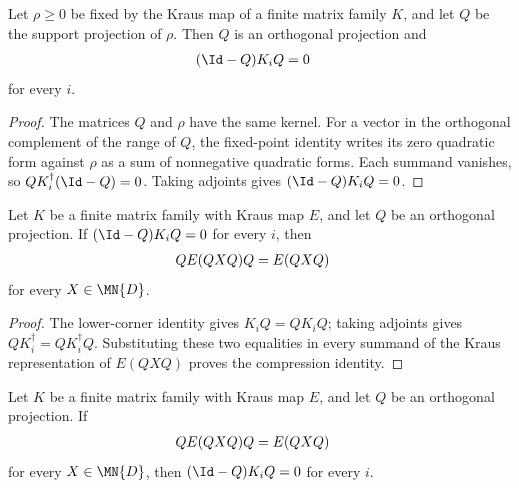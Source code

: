 \begin{theorem}
    \label{thm:kraus_fixed_support_lower_zero}
    \leanok
    Let $\rho\geq0$ be fixed by the Kraus map of a finite matrix family $K$, and
    let $Q$ be the support projection of $\rho$. Then $Q$ is an orthogonal
    projection and
    \begin{align}
        (\Id-Q)K_iQ
         & =0
        \notag
    \end{align}
    for every $i$.
\end{theorem}

\begin{proof}
    \leanok
    The matrices $Q$ and $\rho$ have the same kernel. For a vector in the
    orthogonal complement of the range of $Q$, the fixed-point identity writes
    its zero quadratic form against $\rho$ as a sum of nonnegative quadratic
    forms. Each summand vanishes, so $QK_i^\dagger(\Id-Q)=0$. Taking adjoints
    gives $(\Id-Q)K_iQ=0$.
\end{proof}

\begin{theorem}
    \label{thm:kraus_lower_zero_invariant_compression}
    \leanok
    Let $K$ be a finite matrix family with Kraus map $E$, and let $Q$ be an
    orthogonal projection. If $(\Id-Q)K_iQ=0$ for every $i$, then
    \begin{align}
        Q E(QXQ)Q
         & =E(QXQ)
        \notag
    \end{align}
    for every $X\in\MN{D}$.
\end{theorem}

\begin{proof}
    \leanok
    The lower-corner identity gives $K_iQ=QK_iQ$; taking adjoints gives
    $QK_i^\dagger=QK_i^\dagger Q$. Substituting these two equalities in every
    summand of the Kraus representation of $E(QXQ)$ proves the compression
    identity.
\end{proof}

\begin{theorem}
    \label{thm:kraus_invariant_compression_lower_zero}
    \leanok
    Let $K$ be a finite matrix family with Kraus map $E$, and let $Q$ be an
    orthogonal projection. If
    \begin{align}
        Q E(QXQ)Q
         & =E(QXQ)
        \notag
    \end{align}
    for every $X\in\MN{D}$, then $(\Id-Q)K_iQ=0$ for every $i$.
\end{theorem}

